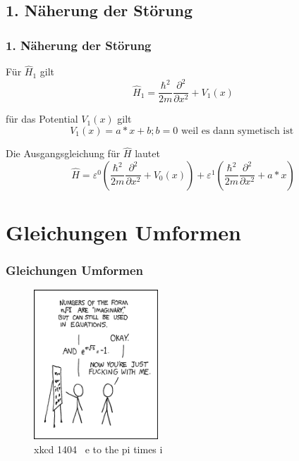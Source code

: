\documentclass[aspectratio=169]{beamer}
\begin{document}
\subsection{ 1. N\"aherung der St\"orung }
\begin{frame} 
  \frametitle{ 1. N\"aherung der St\"orung }

  F\"ur $\hat H_1$ gilt
  \[
    \hat H_1 = \frac{\hbar^2}{2m} \frac{\partial^2}{\partial x^2} + V_1(x)
  \]

  f\"ur das Potential $V_1(x)$ gilt
  \[
    V_1(x) = a*x +b ; b = 0 \text{ weil es dann symetisch ist }
  \]

  Die Ausgangsgleichung f\"ur $\hat{H}$ lautet
  \[
    \hat{H} = \varepsilon^0 ( \frac{\hbar^2}{2m} \frac{\partial^2}{\partial x^2} + V_0(x) )
	      + \varepsilon^1 ( \frac{\hbar^2}{2m} \frac{\partial^2}{\partial x^2} + a*x )
  \]
\end{frame}


\section{ Gleichungen Umformen }
\begin{frame}
  \frametitle{ Gleichungen Umformen }
  \begin{figure}
    \centering
    \includegraphics[height=5.6cm]{./179_e_to_the_pi_times_i.png}
    \caption{ xkcd 1404 \textendash \ e to the pi times i }
    \label{abb:179_e_to_the_pi_times_i}
  \end{figure}

\end{frame}
\end{document}
